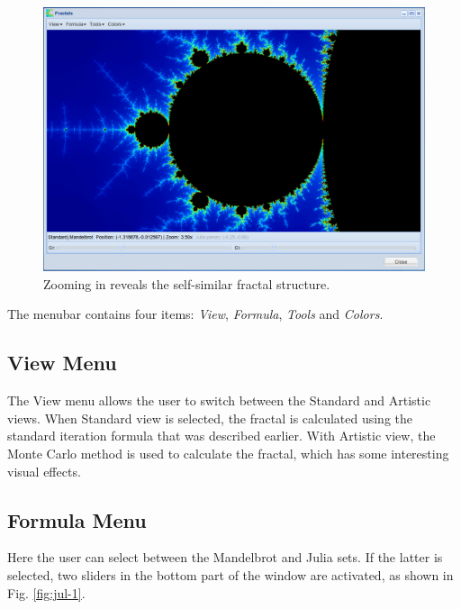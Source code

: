 \documentclass[article,A4,12pt]{llncs}
\begin{document}
\begin{figure}[!ht]
\begin{center}
\includegraphics[width=\textwidth]{img/mandelbrot-2.png}
\end{center}
\caption{Zooming in reveals the self-similar fractal structure.}
\label{fig:man-2}
\end{figure}

\noindent
The menubar contains four items: {\em View}, {\em Formula}, {\em Tools} and {\em Colors}.

\subsection*{View Menu}
The View menu allows the user to switch between the Standard and Artistic views. When Standard view
is selected, the fractal is calculated using the standard iteration formula that was described earlier. 
With Artistic view, the Monte Carlo method is used to calculate the fractal, which has some 
interesting visual effects.

\subsection*{Formula Menu}

Here the user can select between the Mandelbrot and Julia sets. If the latter is selected, two
sliders in the bottom part of the window are activated, as shown in 
Fig. \ref{fig:jul-1}.

\clearpage
\end{document}
